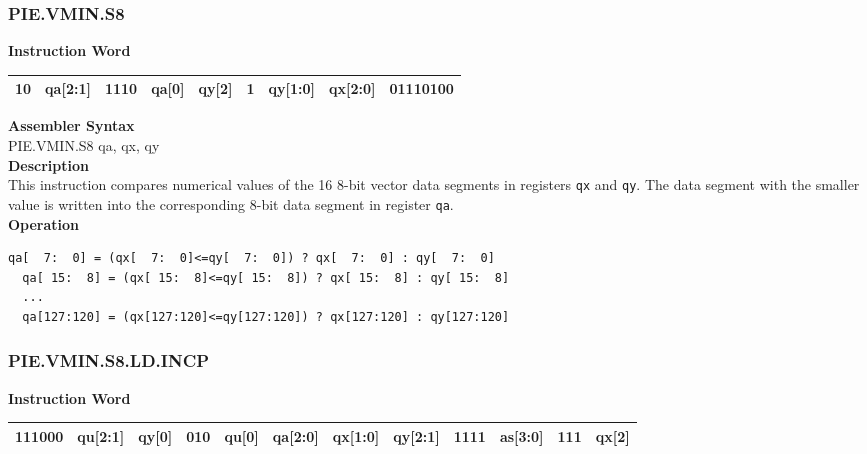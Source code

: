\newpage
\subsubsection{PIE.VMIN.S8}\label{instruction:PIEVMINS8}
\setlength\tabcolsep{6pt}
\textbf{Instruction Word} \\
\begin{tabular}{|c|c|c|c|c|c|c|c|c|}
	\hline
	10 & qa[2:1] & 1110 & qa[0] & qy[2] & 1 & qy[1:0] & qx[2:0] & 01110100 \\
	\hline
\end{tabular}

\textbf{Assembler Syntax} \\
PIE.VMIN.S8 qa, qx, qy \\
\textbf{Description} \\
This instruction compares numerical values of the 16 8-bit vector data segments in registers \lstinline{qx} and \lstinline{qy}. The data segment with the smaller value is written into the corresponding 8-bit data segment in register \lstinline{qa}.\\
\textbf{Operation}
\begin{lstlisting}[escapeinside=`?]
  qa[  7:  0] = (qx[  7:  0]<=qy[  7:  0]) ? qx[  7:  0] : qy[  7:  0]
  qa[ 15:  8] = (qx[ 15:  8]<=qy[ 15:  8]) ? qx[ 15:  8] : qy[ 15:  8]
  ...
  qa[127:120] = (qx[127:120]<=qy[127:120]) ? qx[127:120] : qy[127:120]
\end{lstlisting}

\newpage
\subsubsection{PIE.VMIN.S8.LD.INCP}\label{instruction:PIEVMINS8LDINCP}
\setlength\tabcolsep{6pt}
\textbf{Instruction Word} \\
\begin{tabular}{|c|c|c|c|c|c|c|c|c|c|c|c|}
	\hline
	111000 & qu[2:1] & qy[0] & 010 & qu[0] & qa[2:0] & qx[1:0] & qy[2:1] & 1111 & as[3:0] & 111 & qx[2] \\
	\hline
\end{tabular}

